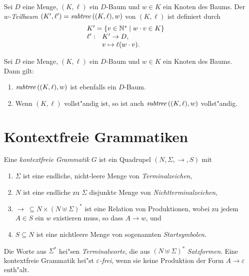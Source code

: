 \documentclass[12pt,a4paper]{article}
\begin{document}
\begin{definition}[Teilbaum]
  Sei $D$ eine Menge, $(K,\ell)$ ein $D$-Baum und $w \in K$ ein Knoten des Baums.
  Der \emph{$w$-Teilbaum} $(K',\ell') = \mathit{subtree}\,((K,\ell),w)$ von $(K,\ell)$ ist definiert
  durch
  \[\begin{array}{rl}
    \multicolumn{2}{l}{K' = \{v \in \N^* \mid w \cdot v \in K\}} \\
    \ell': & K '\to D, \\
    & v \mapsto \ell(w \cdot v).
  \end{array}\]
\end{definition}

\begin{lemma}
  Sei $D$ eine Menge, $(K,\ell)$ ein $D$-Baum und $w \in K$ ein Knoten des Baums. Dann gilt:
  \begin{enumerate}
  \item $\mathit{subtree}\,((K,\ell),w)$ ist ebenfalls ein $D$-Baum.
  \item Wenn $(K,\ell)$ vollst"andig ist, so ist auch $\mathit{subtree}\,((K,\ell),w)$ vollst"andig.
  \end{enumerate}
\end{lemma}


\section{Kontextfreie Grammatiken}

Eine \emph{kontextfreie Grammatik} $G$ ist ein Quadrupel $(N,\Sigma,\to,S)$ mit
\begin{enumerate}
\item $\Sigma$ ist eine endliche, nicht-leere Menge von \emph{Terminalzeichen},
\item $N$ ist eine endliche zu $\Sigma$ disjunkte Menge von \emph{Nichtterminalzeichen},
\item $\to\ \subseteq N \times (N \uplus \Sigma)^*$ ist eine Relation von Produktionen,
  wobei zu jedem $A \in S$ ein $w$ existieren muss, so dass $A \to w$, und
\item $S \subseteq N$ ist eine nichtleere Menge von sogenannten \emph{Startsymbolen}.
\end{enumerate}
Die Worte aus $\Sigma^*$ hei"sen \emph{Terminalworte}, die aus $(N \uplus \Sigma)^*$ \emph{Satzformen}. Eine
kontextfreie Grammatik hei"st \emph{$\varepsilon$-frei}, wenn sie keine Produktion der Form
$A \to \varepsilon$ enth"alt.
\end{document}
